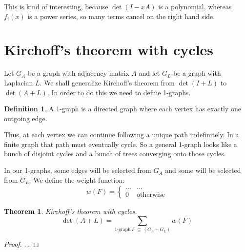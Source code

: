 \documentclass[a4paper, 11pt]{article}
\newtheorem{theorem}{Theorem}[section]
\theoremstyle{definition}
\newtheorem{definition}{Definition}[section]
\begin{document}
This is kind of interesting, because $\det(I - xA)$ is a polynomial, whereas $f_i(x)$ is a power series, so many terms cancel on the right hand side.

\section{Kirchoff's theorem with cycles}

Let $G_A$ be a graph with adjacency matrix $A$ and let $G_L$ be a graph with Laplacian $L$. We shall generalize Kirchoff's theorem from $\det(I + L)$ to $\det(A + L)$. In order to do this we need to define 1-graphs.

\begin{definition}
  A 1-graph is a directed graph where each vertex has exactly one outgoing edge.
\end{definition}

Thus, at each vertex we can continue following a unique path indefinitely. In a finite graph that path must eventually cycle. So a general 1-graph looks like a bunch of disjoint cycles and a bunch of trees converging onto those cycles.

In our 1-graphs, some edges will be selected from $G_A$ and some will be selected from $G_L$. We define the weight function:
\begin{align*}
  w(F) = \begin{cases}
    ... & ... \\
    0 & \text{otherwise}
  \end{cases}
\end{align*}

\begin{theorem} Kirchoff's theorem with cycles.
  \[
    \det(A + L) = \sum_{\text{1-graph}\ F\ \subseteq\ (G_A + G_L)} w(F)
  \]
\end{theorem}
\begin{proof}
  ...
\end{proof}
\end{document}
